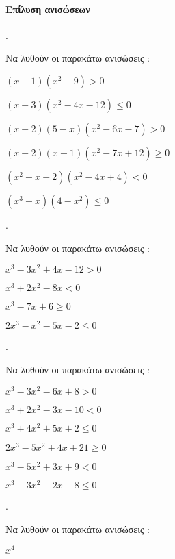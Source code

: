 \documentclass[11pt,a4paper,twocolumn]{article}
\newcounter{askhsh}
\newcommand{\askhsh}{\large\theaskhsh.\ \addtocounter{askhsh}{1}}
\begin{document}
\paragraph{Επίλυση ανισώσεων}
\askhsh Να λυθούν οι παρακάτω ανισώσεις :
\begin{alist}
\item $(x-1)(x^2-9)>0$
\item $(x+3)(x^2-4x-12)\leq 0$
\item $ (x+2)(5-x)(x^2-6x-7)>0 $
\item $ (x-2)(x+1)(x^2-7x+12)\geq0 $
\item $ (x^2+x-2)(x^2-4x+4)<0 $
\item $ (x^3+x)(4-x^2)\leq 0 $
\end{alist}
\askhsh Να λυθούν οι παρακάτω ανισώσεις :
\begin{alist}
\item $ x^3-3x^2+4x-12>0 $
\item $ x^3+2x^2-8x<0 $
\item $ x^3-7x+6\geq 0 $
\item $ 2x^3-x^2-5x-2\leq 0 $
\end{alist}
\askhsh Να λυθούν οι παρακάτω ανισώσεις :
\begin{alist}
\item $ x^3-3x^2-6x+8>0 $
\item $ x^3+2x^2-3x-10<0 $
\item $ x^3+4x^2+5x+2\leq 0 $
\item $ 2x^3-5x^2+4x+21\geq 0 $
\item $ x^3-5x^2+3x+9<0 $
\item $ x^3-3x^2-2x-8\leq 0 $
\end{alist}
\askhsh Να λυθούν οι παρακάτω ανισώσεις :
\begin{alist}%
\item $ x^4 $
\end{alist}
\end{document}
